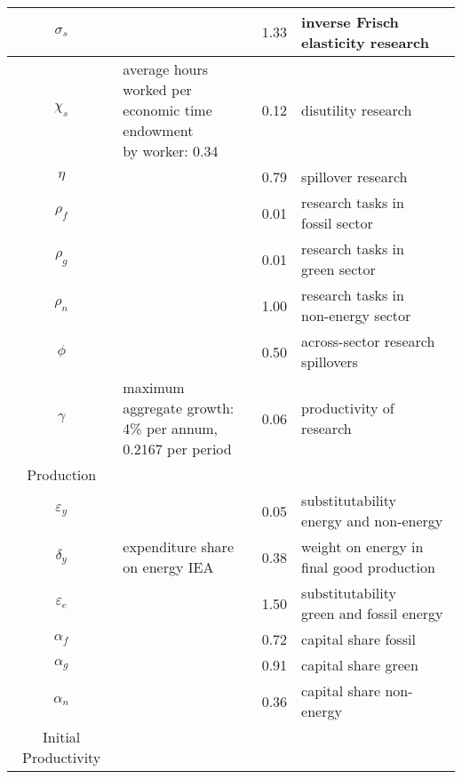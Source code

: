 \begin{table}[h!]
\begin{center}
\begin{tabular}{c|lll}
 			\hline
 			$\sigma_s$ &  \makecell[l]{\cite{Chetty2011AreMargins}}& $1.33$ & inverse Frisch elasticity research \\
 			\hline
 			$\chi_s$ &\makecell[l]{average hours worked per \\ economic time endowment\\ by worker: 0.34 \cite{OECDHoursworked}} & 0.12 & disutility research\\
 			\hline
 			$\eta$ &\makecell[l]{\cite{Fried2018ClimateAnalysis}} & 0.79 & spillover research\\
 			\hline			
 			$\rho_f$ &\makecell[l]{\cite{Fried2018ClimateAnalysis}} & 0.01 &\makecell[l]{research tasks in\\ fossil sector}\\
 			\hline			
 			$\rho_g$ &\makecell[l]{\cite{Fried2018ClimateAnalysis}} & 0.01 &\makecell[l]{research tasks in\\ green sector}\\
 			\hline			
 			$\rho_n$ &\makecell[l]{\cite{Fried2018ClimateAnalysis}} & 1.00 &\makecell[l]{research tasks in \\non-energy sector}\\
 			\hline			
 			$\phi$ &\makecell[l]{\cite{Fried2018ClimateAnalysis}} & 0.50 &across-sector research spillovers\\
 			\hline
 			$\gamma$ &\makecell[l]{maximum aggregate growth:\\4\% per annum, 0.2167 per period} & 0.06 & productivity of research\\
 			\hline
 			\hline
 			Production&\multicolumn{3}{c}{}\\
 			\hline
 			
 			\hline
 			$\varepsilon_y$&\cite{Fried2018ClimateAnalysis}&0.05& \makecell[l]{substitutability \\ energy and non-energy}\\			
 			\hline
 			$\delta_y$&\makecell[l]{expenditure share \\ on energy IEA}&0.38& \makecell[l]{weight on energy in\\ final good production}\\	
 			\hline
 			$\varepsilon_e$&\cite{Fried2018ClimateAnalysis}&1.50& \makecell[l]{substitutability \\ green and fossil energy}\\	
 			\hline
 			$\alpha_f$&\cite{Fried2018ClimateAnalysis} &0.72& capital share fossil  \\
 			\hline
 			$\alpha_g$&\cite{Fried2018ClimateAnalysis} &0.91& capital share green \\
 			\hline
 			$\alpha_n$&\cite{Fried2018ClimateAnalysis} &0.36& capital share non-energy  \\
 			\hline
 			\hline
 			Initial Productivity&\multicolumn{3}{c}{}\\
 			\hline
 			

\end{tabular}
\end{center}
\end{table}
